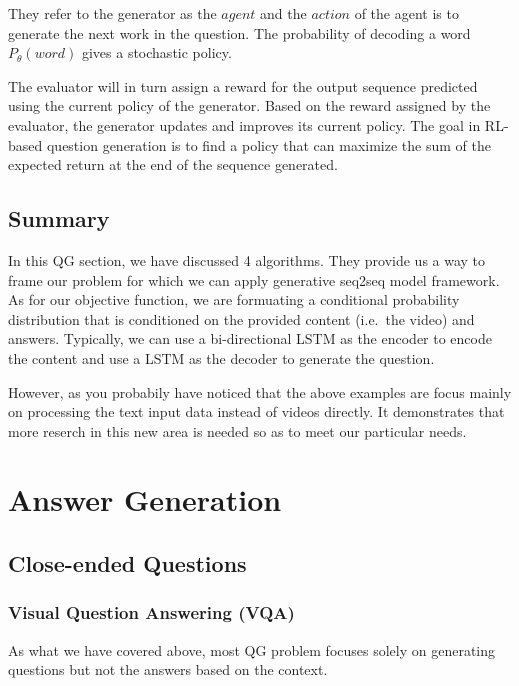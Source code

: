 \documentclass[]{book}
\theoremstyle{definition}
\theoremstyle{definition}
\theoremstyle{definition}
\theoremstyle{remark}
\begin{document}
They refer to the generator as the \(agent\) and the \(action\) of the
agent is to generate the next work in the question. The probability of
decoding a word \(P_{\theta}(word)\) gives a stochastic policy.

The evaluator will in turn assign a reward for the output sequence
predicted using the current policy of the generator. Based on the reward
assigned by the evaluator, the generator updates and improves its
current policy. The goal in RL-based question generation is to find a
policy that can maximize the sum of the expected return at the end of
the sequence generated.

\subsection{Summary}\label{summary}

In this QG section, we have discussed 4 algorithms. They provide us a
way to frame our problem for which we can apply generative seq2seq model
framework. As for our objective function, we are formuating a
conditional probability distribution that is conditioned on the provided
content (i.e.~the video) and answers. Typically, we can use a
bi-directional LSTM as the encoder to encode the content and use a LSTM
as the decoder to generate the question.

However, as you probabily have noticed that the above examples are focus
mainly on processing the text input data instead of videos directly. It
demonstrates that more reserch in this new area is needed so as to meet
our particular needs.

\section{Answer Generation}\label{answer-generation}

\subsection{Close-ended Questions}\label{close-ended-questions}

\subsubsection{Visual Question Answering
(VQA)}\label{visual-question-answering-vqa}

As what we have covered above, most QG problem focuses solely on
generating questions but not the answers based on the context.
\end{document}
